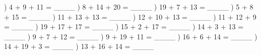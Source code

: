 \documentclass{article}%
\begin{document}
) 4 + 9 + 11 = \_\_\_\_%
\newline%
\newline%
) 8 + 14 + 20 = \_\_\_\_%
\newline%
\newline%
) 19 + 7 + 13 = \_\_\_\_%
\newline%
\newline%
) 5 + 8 + 15 = \_\_\_\_%
\newline%
\newline%
) 11 + 13 + 13 = \_\_\_\_%
\newline%
\newline%
) 12 + 10 + 13 = \_\_\_\_%
\newline%
\newline%
) 11 + 12 + 9 = \_\_\_\_%
\newline%
\newline%
) 19 + 17 + 17 = \_\_\_\_%
\newline%
\newline%
) 15 + 2 + 17 = \_\_\_\_%
\newline%
\newline%
) 14 + 3 + 13 = \_\_\_\_%
\newline%
\newline%
) 9 + 7 + 12 = \_\_\_\_%
\newline%
\newline%
) 9 + 19 + 11 = \_\_\_\_%
\newline%
\newline%
) 16 + 6 + 14 = \_\_\_\_%
\newline%
\newline%
) 14 + 19 + 3 = \_\_\_\_%
\newline%
\newline%
) 13 + 16 + 14 = \_\_\_\_%
\newline%
\end{document}
